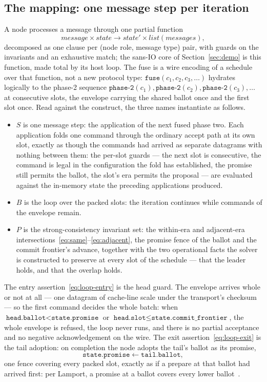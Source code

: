 \documentclass[10pt,journal,letterpaper]{IEEEtran}
\newcommand{\code}[1]{\texttt{#1}}
\begin{document}
\subsection{The mapping: one message step per iteration}
A node processes a message through one partial function
\begin{equation*}
\mathit{message} \times \mathit{state} \to \mathit{state}' \times \mathit{list}(\mathit{messages}),
\end{equation*}
decomposed as one clause per (node role, message type) pair, with guards on the invariants and an exhaustive match; the sans-IO core of Section~\ref{sec:demo} is this function, made total by its host loop. The fuse is a wire encoding of a schedule over that function, not a new protocol type: $\code{fuse}(c_1, c_2, c_3, \ldots)$ hydrates logically to the phase-2 sequence $\code{phase-2}(c_1), \code{phase-2}(c_2), \code{phase-2}(c_3), \ldots$ at consecutive slots, the envelope carrying the shared ballot once and the first slot once. Read against the construct, the three names instantiate as follows.
\begin{itemize}
\item $S$ is one message step: the application of the next fused phase two. Each application folds one command through the ordinary accept path at its own slot, exactly as though the commands had arrived as separate datagrams with nothing between them: the per-slot guards --- the next slot is consecutive, the command is legal in the configuration the fold has established, the promise still permits the ballot, the slot's era permits the proposal --- are evaluated against the in-memory state the preceding applications produced.
\item $B$ is the loop over the packed slots: the iteration continues while commands of the envelope remain.
\item $P$ is the strong-consistency invariant set: the within-era and adjacent-era intersections~\eqref{eq:same}--\eqref{eq:adjacent}, the promise fence of the ballot and the commit frontier's advance, together with the two operational facts the solver is constructed to preserve at every slot of the schedule --- that the leader holds, and that the overlap holds.
\end{itemize}
The entry assertion~\eqref{eq:loop-entry} is the head guard. The envelope arrives whole or not at all --- one datagram of cache-line scale under the transport's checksum --- so the first command decides the whole batch: when $\code{head.ballot} < \code{state.promise}$ or $\code{head.slot} \le \code{state.commit\_frontier}$, the whole envelope is refused, the loop never runs, and there is no partial acceptance and no negative acknowledgement on the wire. The exit assertion~\eqref{eq:loop-exit} is the tail adoption: on completion the node adopts the tail's ballot as its promise,
\begin{equation*}
\code{state.promise} \leftarrow \code{tail.ballot},
\end{equation*}
one fence covering every packed slot, exactly as if a prepare at that ballot had arrived first: per Lamport, a promise at a ballot covers every lower ballot~\cite{pms}.
\end{document}
